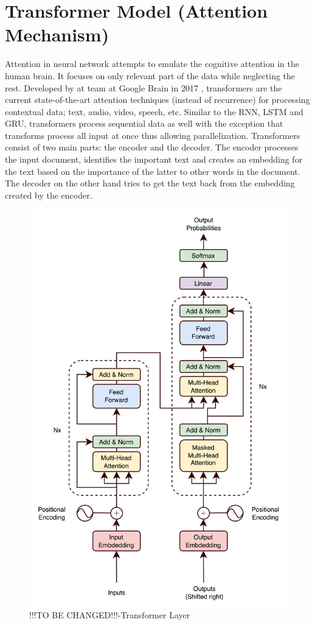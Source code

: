 \section{Transformer Model (Attention Mechanism)}
Attention in neural network attempts to emulate the cognitive attention in the human brain. It focuses on only relevant part of the data while neglecting the rest. Developed by at team at Google Brain in 2017 \cite{Vaswani2017}, transformers are the current state-of-the-art attention techniques (instead of recurrence) for processing contextual data; text, audio, video, speech, etc. Similar to the RNN, LSTM and GRU, transformers process sequential data as well with the exception that transforms process all input at once thus allowing parallelization. Transformers consist of two main parts: the encoder and the decoder. The encoder processes the input document, identifies the important text and creates an embedding for the text based on the importance of the latter to other words in the document. The decoder on the other hand tries to get the text back from the embedding created by the encoder.
\begin{figure}[H]
    \centering
    \includegraphics[scale=0.60]{CHAPTER_4/c4_fig_transformer_layer_draw.png}
    \caption{!!!TO BE CHANGED!!!-Transformer Layer}
    \label{TRANSFORMER_LAYER}
  \end{figure}
